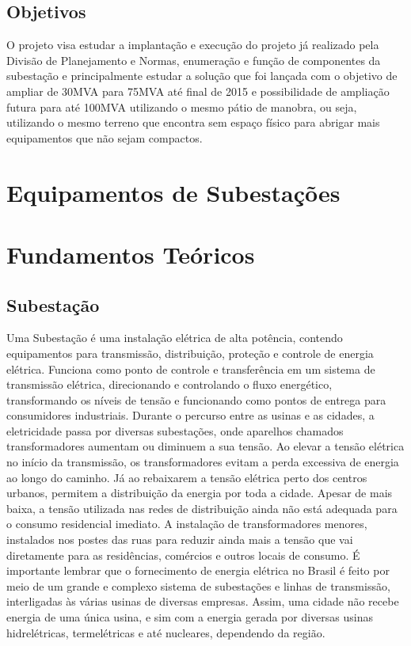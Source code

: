 \documentclass[a5paper]{ufsc-thesis}
\begin{document}
\section{Objetivos}
O projeto visa estudar a implantação e execução do projeto já realizado pela Divisão de Planejamento e Normas, enumeração e função de componentes da subestação e principalmente estudar a solução que foi lançada com o objetivo de ampliar de 30MVA para 75MVA até final de 2015 e possibilidade de ampliação futura para até 100MVA utilizando o mesmo pátio de manobra, ou seja, utilizando o mesmo terreno que encontra sem espaço físico para abrigar mais equipamentos que não sejam compactos.


\chapter{Equipamentos de Subestações}
\label{chap:equipSE}

\chapter{Fundamentos Teóricos}

\section{Subestação}
Uma Subestação é uma instalação elétrica de alta potência, contendo equipamentos para transmissão, distribuição, proteção e controle de energia elétrica. Funciona como ponto de controle e transferência em um sistema de transmissão elétrica, direcionando e controlando o fluxo energético, transformando os níveis de tensão e funcionando como pontos de entrega para consumidores industriais. Durante o percurso entre as usinas e as cidades, a eletricidade passa por diversas subestações, onde aparelhos chamados transformadores aumentam ou diminuem a sua tensão. Ao elevar a tensão elétrica no início da transmissão, os transformadores evitam a perda excessiva de energia ao longo do caminho. Já ao rebaixarem a tensão elétrica perto dos centros urbanos, permitem a distribuição da energia por toda a cidade. Apesar de mais baixa, a tensão utilizada nas redes de distribuição ainda não está adequada para o consumo residencial imediato. A instalação de transformadores menores, instalados nos postes das ruas para reduzir ainda mais a tensão que vai diretamente para as residências, comércios e outros locais de consumo. É importante lembrar que o fornecimento de energia elétrica no Brasil é feito por meio de um grande e complexo sistema de subestações e linhas de transmissão, interligadas às várias usinas de diversas empresas. Assim, uma cidade não recebe energia de uma única usina, e sim com a energia gerada por diversas usinas hidrelétricas, termelétricas e até nucleares, dependendo da região.
\end{document}
